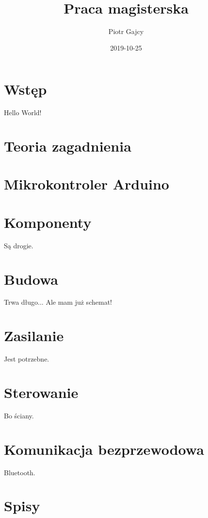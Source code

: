 \documentclass[a4paper, 12pt]{report}
\begin{document}
\title{Praca magisterska}
\date{2019-10-25}
\author{Piotr Gajcy}

  \maketitle
  \newpage
  \tableofcontents
  \newpage
  
\chapter*{Wstęp}
Hello World!

\chapter{Teoria zagadnienia}
 
\chapter{Mikrokontroler Arduino}

\chapter{Komponenty}
Są drogie.
\chapter{Budowa}
Trwa długo... Ale mam już schemat!
\chapter{Zasilanie}
Jest potrzebne.
\chapter{Sterowanie}
Bo ściany.
\chapter{Komunikacja bezprzewodowa}
Bluetooth.

\chapter{Spisy}
\listoffigures
\listoftables



\end{document}
